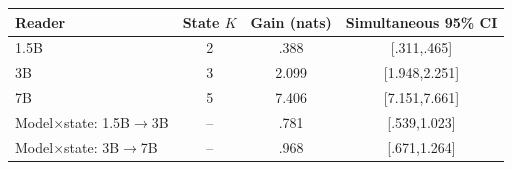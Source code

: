 \begin{tabular}{lccc}
\toprule
Reader & State $K$ & Gain (nats) & Simultaneous 95\% CI \\
\midrule
1.5B & 2 & .388 & [.311,.465] \\
3B & 3 & 2.099 & [1.948,2.251] \\
7B & 5 & 7.406 & [7.151,7.661] \\
\midrule
Model$\times$state: 1.5B$\to$3B & -- & .781 & [.539,1.023] \\
Model$\times$state: 3B$\to$7B & -- & .968 & [.671,1.264] \\
\bottomrule
\end{tabular}
